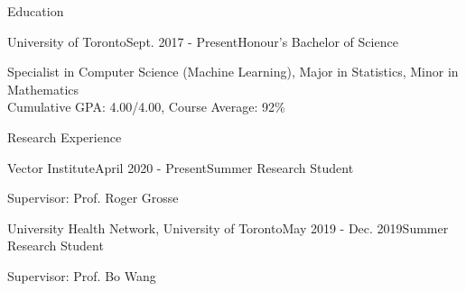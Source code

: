 \documentclass{resume} %
\begin{document}

\begin{rSection}{Education}
\begin{rSubsection}{University of Toronto}{Sept. 2017 - Present}{Honour's Bachelor of Science}{}
\item
Specialist in Computer Science (Machine Learning), Major in Statistics, Minor in Mathematics\\
Cumulative GPA: 4.00/4.00, Course Average: 92\%
\end{rSubsection}
\end{rSection}



\begin{rSection}{Research Experience}
\begin{rSubsection}{Vector Institute}{April 2020 - Present}{Summer Research Student}{}
\item
Supervisor: Prof. Roger Grosse
\end{rSubsection}
\begin{rSubsection}{University Health Network, University of Toronto}{May 2019 - Dec. 2019}{Summer Research Student}{}
\item
Supervisor: Prof. Bo Wang
\end{rSubsection}
\end{rSection}
\end{document}

